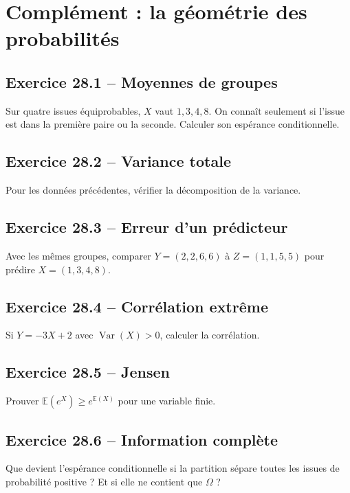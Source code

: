 \chapter{Complément : la géométrie des probabilités}
\section*{Exercice 28.1 -- Moyennes de groupes}
Sur quatre issues équiprobables, $X$ vaut $1,3,4,8$. On connaît seulement si l'issue est dans la première paire ou la seconde. Calculer son espérance conditionnelle.

\section*{Exercice 28.2 -- Variance totale}
Pour les données précédentes, vérifier la décomposition de la variance.

\section*{Exercice 28.3 -- Erreur d'un prédicteur}
Avec les mêmes groupes, comparer $Y=(2,2,6,6)$ à $Z=(1,1,5,5)$ pour prédire $X=(1,3,4,8)$.

\section*{Exercice 28.4 -- Corrélation extrême}
Si $Y=-3X+2$ avec $\operatorname{Var}(X)>0$, calculer la corrélation.

\section*{Exercice 28.5 -- Jensen}
Prouver $\mathbb E(e^X)\ge e^{\mathbb E(X)}$ pour une variable finie.

\section*{Exercice 28.6 -- Information complète}
Que devient l'espérance conditionnelle si la partition sépare toutes les issues de probabilité positive ? Et si elle ne contient que $\Omega$ ?
